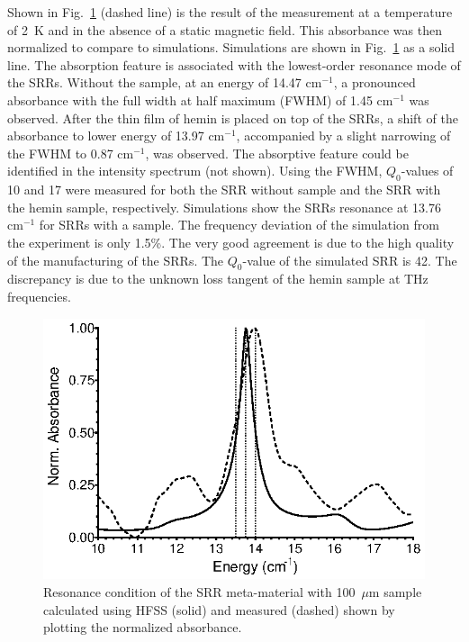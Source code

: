 Shown in Fig.~\ref{ch3-fig:resonator} (dashed line) is the result of the measurement at a temperature of 2~K and in the absence of a static magnetic field. This absorbance was then normalized to compare to simulations. Simulations are shown in Fig.~\ref{ch3-fig:resonator} as a solid line. The absorption feature is associated with the lowest-order resonance mode of the SRRs. \cite{Katsarakis04} Without the sample, at an energy of 14.47 cm$^{-1}$, a pronounced absorbance with the full width at half maximum (FWHM) of 1.45 cm$^{-1}$ was observed. After the thin film of hemin is placed on top of the SRRs, a shift of the absorbance to lower energy of 13.97 cm$^{-1}$, accompanied by a slight narrowing of the FWHM to 0.87 cm$^{-1}$, was observed. The absorptive feature could be identified in the intensity spectrum (not shown). Using the FWHM, $Q_0$-values of 10 and 17 were measured for both the SRR without sample and the SRR with the hemin sample, respectively. Simulations show the SRRs resonance at 13.76 cm$^{-1}$ for SRRs with a sample. The frequency deviation of the simulation from the experiment is only 1.5\%. The very good agreement is due to the high quality of the manufacturing of the SRRs. The $Q_0$-value of the simulated SRR is 42. The discrepancy is due to the unknown loss tangent of the hemin sample at THz frequencies.


\begin{figure}[htp]\centering
  \includegraphics{Kapitel/Ch3-Images/03-SRR_Profile.eps}%
  \caption[Simulated and measured SRR resonance.]{Resonance condition of the SRR meta-material with 100~$\mu$m sample calculated using HFSS (solid) and measured (dashed) shown by plotting the normalized absorbance.}
  \label{ch3-fig:resonator}
\end{figure}

